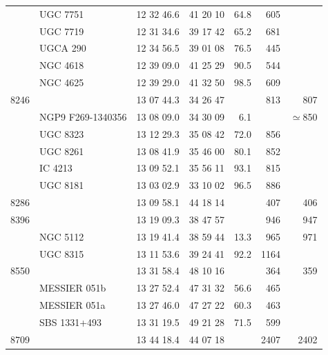 \documentclass{aa}
\begin{document}
\begin{center}
\begin{table}
\begin{center}
\begin{tabular}{|c|l|c|c|r|r|r|}
      & UGC 7751                 & 12 32 46.6 & 41 20 10   &   64.8 &   605  &       \\
      & UGC 7719                 & 12 31 34.6 & 39 17 42   &   65.2 &   681  &       \\
      & UGCA 290                 & 12 34 56.5 & 39 01 08   &   76.5 &   445  &       \\
      & NGC 4618                 & 12 39 09.0 & 41 25 29   &   90.5 &   544  &       \\
      & NGC 4625                 & 12 39 29.0 & 41 32 50   &   98.5 &   609  &       \\
\hline
8246  &                          & 13 07 44.3 & 34 26 47   &        &   813  &   807\\
      & NGP9 F269-1340356        & 13 08 09.0 & 34 30 09   &   6.1  &        &   $\simeq$850 \\
      & UGC 8323                 & 13 12 29.3 & 35 08 42   &   72.0 &   856  &       \\
      & UGC 8261                 & 13 08 41.9 & 35 46 00   &   80.1 &   852  &       \\
      & IC 4213                  & 13 09 52.1 & 35 56 11   &   93.1 &   815  &       \\
      & UGC 8181                 & 13 03 02.9 & 33 10 02   &   96.5 &   886  &       \\
\hline
8286  &                          & 13 09 58.1 & 44 18 14   &        &   407  &   406\\
\hline
8396  &                          & 13 19 09.3 & 38 47 57   &        &   946  &   947 \\
      & NGC 5112                 & 13 19 41.4 & 38 59 44   &   13.3 &   965  &   971 \\
      & UGC 8315                 & 13 11 53.6 & 39 24 41   &   92.2 &   1164 &       \\
\hline
8550  &                          & 13 31 58.4 & 48 10 16   &        &   364  &   359\\
      & MESSIER 051b             & 13 27 52.4 & 47 31 32   &   56.6 &   465  &       \\
      & MESSIER 051a             & 13 27 46.0 & 47 27 22   &   60.3 &   463  &       \\
      & SBS 1331+493             & 13 31 19.5 & 49 21 28   &   71.5 &   599  &       \\
\hline
8709  &                          & 13 44 18.4 & 44 07 18   &        &   2407 &   2402\\

\end{tabular}
\end{center}
\end{table}
\end{center}
\end{document}
